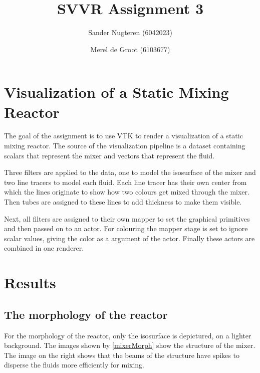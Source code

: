 \documentclass{article}
\begin{document}
\title{SVVR Assignment 3}
\author{Sander Nugteren (6042023) \and Merel de Groot (6103677)}
\renewcommand{\today}{November 24, 2014}
\maketitle

\section*{Visualization of a Static Mixing Reactor}
The goal of the assignment is to use VTK to render a visualization of a static mixing reactor. The source of the visualization pipeline is a dataset containing scalars that represent the mixer and vectors that represent the fluid. 

Three filters are applied to the data, one to model the isosurface of the mixer and two line tracers to model each fluid. Each line tracer has their own center from which the lines originate to show how two colours get mixed through the mixer. Then tubes are assigned to these lines to add thickness to make them visible.  

Next, all filters are assigned to their own mapper to set the graphical primitives and then passed on to an actor. For colouring the mapper stage is set to ignore scalar values, giving the color as a argument of the actor. Finally these actors are combined in one renderer. 

\section*{Results}
\subsection*{The morphology of the reactor}
For the morphology of the reactor, only the isosurface is depictured, on a lighter background. The images shown by \ref{mixerMorph} show the structure of the mixer. The image on the right shows that the beams of the structure have spikes to disperse the fluids more efficiently for mixing.
\end{document}
